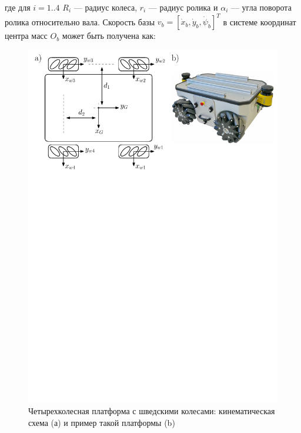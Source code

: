 \documentclass[14pt, a4paper]{extreport}
\begin{document}
\noindent
где для $i=1..4$ $R_i$ --- радиус колеса, $r_i$ --- радиус ролика и $\alpha_i$ --- угла поворота ролика относительно вала. Скорость базы $v_{b} = [\dot{x}_b, \dot{y}_b, \dot{\psi}_b]^T$ в системе координат центра масс $O_b$ может быть получена как:

\newpage
\begin{figure}[!h]
\centering
\captionsetup{justification=centering}
\renewcommand{\figurename}{Рисунок}
\includegraphics[width=1\textwidth]{omnib.pdf}	%
\caption{Четырехколесная платформа с шведскими колесами: кинематическая схема (а) и пример такой платформы (b)}
\label{pic:6}
\end{figure}
\end{document}

